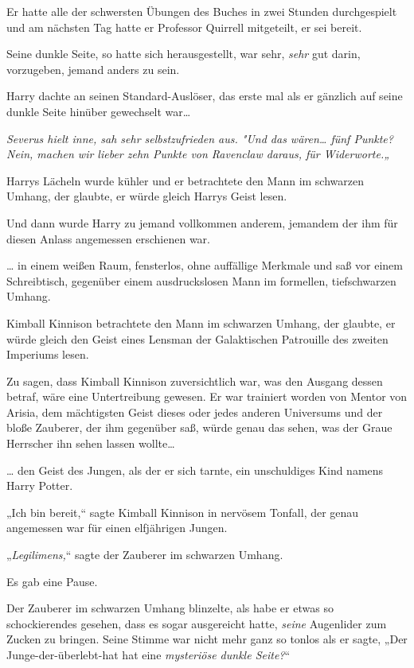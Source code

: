 {Er hatte alle der schwersten Übungen des Buches in zwei Stunden durchgespielt und am nächsten Tag hatte er Professor Quirrell mitgeteilt, er sei bereit.

Seine dunkle Seite, so hatte sich herausgestellt, war sehr, \emph{sehr} gut darin, vorzugeben, jemand anders zu sein.

Harry dachte an seinen Standard-Auslöser, das erste mal als er gänzlich auf seine dunkle Seite hinüber gewechselt war…

\emph{Severus hielt inne, sah sehr selbstzufrieden aus. "Und das wären… fünf Punkte? Nein, machen wir lieber zehn Punkte von Ravenclaw daraus, für Widerworte.„}

Harrys Lächeln wurde kühler und er betrachtete den Mann im schwarzen Umhang, der glaubte, er würde gleich Harrys Geist lesen.

Und dann wurde Harry zu jemand vollkommen anderem, jemandem der ihm für diesen Anlass angemessen erschienen war.

… in einem weißen Raum, fensterlos, ohne auffällige Merkmale und saß vor einem Schreibtisch, gegenüber einem ausdruckslosen Mann im formellen, tiefschwarzen Umhang.

Kimball Kinnison betrachtete den Mann im schwarzen Umhang, der glaubte, er würde gleich den Geist eines Lensman der Galaktischen Patrouille des zweiten Imperiums lesen.

Zu sagen, dass Kimball Kinnison zuversichtlich war, was den Ausgang dessen betraf, wäre eine Untertreibung gewesen. Er war trainiert worden von Mentor von Arisia, dem mächtigsten Geist dieses oder jedes anderen Universums und der bloße Zauberer, der ihm gegenüber saß, würde genau das sehen, was der Graue Herrscher ihn sehen lassen wollte…

… den Geist des Jungen, als der er sich tarnte, ein unschuldiges Kind namens Harry Potter.

„Ich bin bereit,“ sagte Kimball Kinnison in nervösem Tonfall, der genau angemessen war für einen elfjährigen Jungen.

„\emph{Legilimens,}“ sagte der Zauberer im schwarzen Umhang.

Es gab eine Pause.

Der Zauberer im schwarzen Umhang blinzelte, als habe er etwas so schockierendes gesehen, dass es sogar ausgereicht hatte, \emph{seine} Augenlider zum Zucken zu bringen. Seine Stimme war nicht mehr ganz so tonlos als er sagte, „Der Junge-der-überlebt-hat hat eine \emph{mysteriöse dunkle Seite?}“

}

